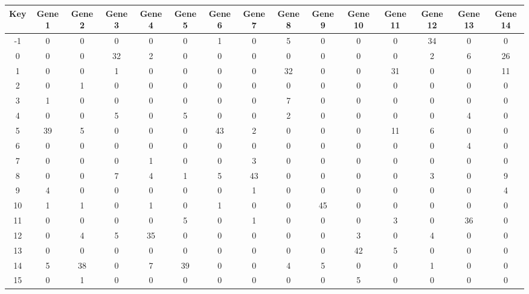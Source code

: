 \begin{tabular}{|c|c|c|c|c|c|c|c|c|c|c|c|c|c|c|}
\hline
Key & Gene 1 & Gene 2 & Gene 3 & Gene 4 & Gene 5 & Gene 6 & Gene 7 & Gene 8 & Gene 9 & Gene 10 & Gene 11 & Gene 12 & Gene 13 & Gene 14 \\
\hline
-1 & 0 & 0 & 0 & 0 & 0 & 1 & 0 & 5 & 0 & 0 & 0 & 34 & 0 & 0 \\
0 & 0 & 0 & 32 & 2 & 0 & 0 & 0 & 0 & 0 & 0 & 0 & 2 & 6 & 26 \\
1 & 0 & 0 & 1 & 0 & 0 & 0 & 0 & 32 & 0 & 0 & 31 & 0 & 0 & 11 \\
2 & 0 & 1 & 0 & 0 & 0 & 0 & 0 & 0 & 0 & 0 & 0 & 0 & 0 & 0 \\
3 & 1 & 0 & 0 & 0 & 0 & 0 & 0 & 7 & 0 & 0 & 0 & 0 & 0 & 0 \\
4 & 0 & 0 & 5 & 0 & 5 & 0 & 0 & 2 & 0 & 0 & 0 & 0 & 4 & 0 \\
5 & 39 & 5 & 0 & 0 & 0 & 43 & 2 & 0 & 0 & 0 & 11 & 6 & 0 & 0 \\
6 & 0 & 0 & 0 & 0 & 0 & 0 & 0 & 0 & 0 & 0 & 0 & 0 & 4 & 0 \\
7 & 0 & 0 & 0 & 1 & 0 & 0 & 3 & 0 & 0 & 0 & 0 & 0 & 0 & 0 \\
8 & 0 & 0 & 7 & 4 & 1 & 5 & 43 & 0 & 0 & 0 & 0 & 3 & 0 & 9 \\
9 & 4 & 0 & 0 & 0 & 0 & 0 & 1 & 0 & 0 & 0 & 0 & 0 & 0 & 4 \\
10 & 1 & 1 & 0 & 1 & 0 & 1 & 0 & 0 & 45 & 0 & 0 & 0 & 0 & 0 \\
11 & 0 & 0 & 0 & 0 & 5 & 0 & 1 & 0 & 0 & 0 & 3 & 0 & 36 & 0 \\
12 & 0 & 4 & 5 & 35 & 0 & 0 & 0 & 0 & 0 & 3 & 0 & 4 & 0 & 0 \\
13 & 0 & 0 & 0 & 0 & 0 & 0 & 0 & 0 & 0 & 42 & 5 & 0 & 0 & 0 \\
14 & 5 & 38 & 0 & 7 & 39 & 0 & 0 & 4 & 5 & 0 & 0 & 1 & 0 & 0 \\
15 & 0 & 1 & 0 & 0 & 0 & 0 & 0 & 0 & 0 & 5 & 0 & 0 & 0 & 0 \\
\hline
\end{tabular}
